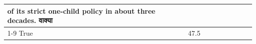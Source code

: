 \begin{table}[H]
\begin{tabular}{lllrlllll}
of its strict one-child policy in about three decades. वाक्या \\
\cline{1-9}
True & 47.5%
\end{tabular}
\end{table}
